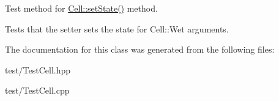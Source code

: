 Test method for \hyperlink{class_cell_ac388ff95a4d94da1497847ead859f258}{Cell\+::set\+State()} method. 

Tests that the setter sets the state for Cell\+::\+Wet arguments. 

The documentation for this class was generated from the following files\+:\begin{DoxyCompactItemize}
\item 
test/Test\+Cell.\+hpp\item 
test/Test\+Cell.\+cpp\end{DoxyCompactItemize}
